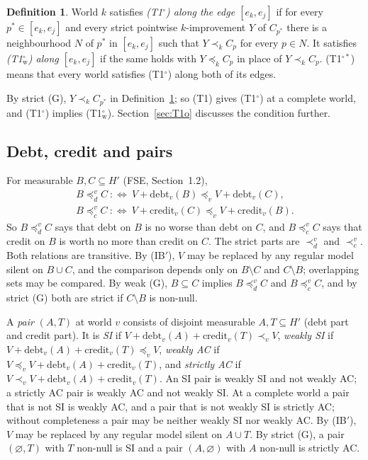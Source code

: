 \documentclass[11pt]{article}
\theoremstyle{definition}\newtheorem{definition}[theorem]{Definition}
\theoremstyle{remark}\newtheorem{remark}[theorem]{Remark}
\newcommand{\debt}{\mathrm{debt}}
\newcommand{\cred}{\mathrm{credit}}
\newcommand{\Tw}{\textup{(T1$^\circ_{\mathrm w}$)}}
\newcommand{\To}{\textup{(T1$^\circ$)}}
\newcommand{\Tos}{\textup{(T1$^{\circ*}$)}}
\begin{document}
\begin{definition}\label{def:T1o}
World $k$ satisfies \emph{\To{} along the edge $[e_k,e_j]$} if for every
$p^*\in[e_k,e_j]$ and every strict pointwise $k$-improvement $Y$ of
$C_{p^*}$ there is a neighbourhood $N$ of $p^*$ in $[e_k,e_j]$ such that
$Y\prec_kC_p$ for every $p\in N$. It satisfies \emph{\Tw{} along
$[e_k,e_j]$} if the same holds with $Y\preceq_kC_p$ in place of
$Y\prec_kC_p$. \Tos{} means that every world satisfies \To{} along both of
its edges.
\end{definition}

By strict (G), $Y\prec_kC_{p^*}$ in Definition~\ref{def:T1o}; so (T1) gives
\To{} at a complete world, and \To{} implies \Tw. Section~\ref{sec:T1o}
discusses the condition further.

\subsection{Debt, credit and pairs}\label{sec:pairs}

For measurable $B,C\subseteq H'$ (FSE, Section~1.2),
\begin{gather*}
 B\preceq^v_dC\ :\Longleftrightarrow\ V+\debt_v(B)\preceq_vV+\debt_v(C),\\
 B\preceq^v_cC\ :\Longleftrightarrow\ V+\cred_v(C)\preceq_vV+\cred_v(B).
\end{gather*}
So $B\preceq^v_dC$ says that debt on $B$ is no worse than debt on $C$, and
$B\preceq^v_cC$ says that credit on $B$ is worth no more than credit on $C$.
The strict parts are $\prec^v_d$ and $\prec^v_c$. Both relations are
transitive. By (IB$'$), $V$ may be replaced by any regular model silent on
$B\cup C$, and the comparison depends only on $B\setminus C$ and
$C\setminus B$; overlapping sets may be compared. By weak (G),
$B\subseteq C$ implies $B\preceq^v_dC$ and $B\preceq^v_cC$, and by strict (G)
both are strict if $C\setminus B$ is non-null.

A \emph{pair} $(A,T)$ at world $v$ consists of disjoint measurable
$A,T\subseteq H'$ (debt part and credit part). It is \emph{SI} if
$V+\debt_v(A)+\cred_v(T)\prec_vV$, \emph{weakly SI} if
$V+\debt_v(A)+\cred_v(T)\preceq_vV$, \emph{weakly AC} if
$V\preceq_vV+\debt_v(A)+\cred_v(T)$, and \emph{strictly AC} if
$V\prec_vV+\debt_v(A)+\cred_v(T)$. An SI pair is weakly SI and not weakly
AC; a strictly AC pair is weakly AC and not weakly SI. At a complete world a
pair that is not SI is weakly AC, and a pair that is not weakly SI is
strictly AC; without completeness a pair may be neither weakly SI nor
weakly AC. By (IB$'$), $V$ may
be replaced by any regular model silent on $A\cup T$. By strict (G), a pair
$(\varnothing,T)$ with $T$ non-null is SI and a pair $(A,\varnothing)$ with
$A$ non-null is strictly AC.
\end{document}
